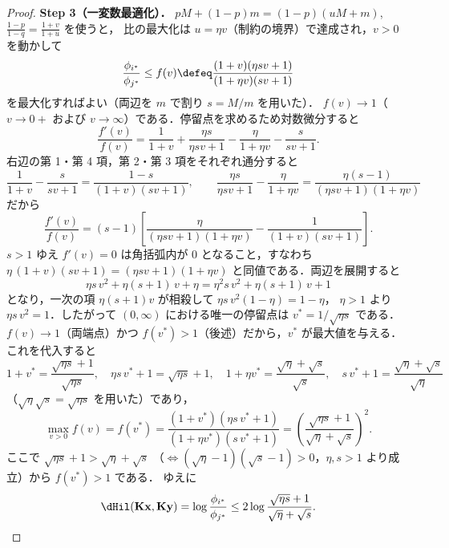 \begin{proof}
  \textbf{Step 3（一変数最適化）．}
  $p M + (1-p)m = (1-p)(uM + m)$, $\frac{1-p}{1-q} = \frac{1+v}{1+u}$ を使うと，
  比の最大化は $u = \eta v$（制約の境界）で達成され，$v > 0$ を動かして
  \[
    \frac{\phi_{i^*}}{\phi_{j^*}}
    \leq f(v) \defeq \frac{(1+v)(\eta s v + 1)}{(1+\eta v)(s v + 1)}
  \]
  を最大化すればよい（両辺を $m$ で割り $s = M/m$ を用いた）．
  $f(v) \to 1$（$v \to 0+$ および $v \to \infty$）である．停留点を求めるため対数微分すると
  \[
    \frac{f'(v)}{f(v)}
    = \frac{1}{1+v} + \frac{\eta s}{\eta s v + 1}
      - \frac{\eta}{1+\eta v} - \frac{s}{s v + 1}.
  \]
  右辺の第 1・第 4 項，第 2・第 3 項をそれぞれ通分すると
  \[
    \frac{1}{1+v} - \frac{s}{s v + 1}
    = \frac{1-s}{(1+v)(s v + 1)},
    \qquad
    \frac{\eta s}{\eta s v + 1} - \frac{\eta}{1+\eta v}
    = \frac{\eta(s-1)}{(\eta s v + 1)(1+\eta v)}
  \]
  だから
  \[
    \frac{f'(v)}{f(v)}
    = (s-1)\left[
        \frac{\eta}{(\eta s v + 1)(1+\eta v)}
        - \frac{1}{(1+v)(s v + 1)}
      \right].
  \]
  $s > 1$ ゆえ $f'(v) = 0$ は角括弧内が $0$ となること，すなわち
  $\eta\,(1+v)(s v + 1) = (\eta s v + 1)(1+\eta v)$ と同値である．両辺を展開すると
  \[
    \eta s\,v^2 + \eta(s+1)\,v + \eta
    = \eta^2 s\,v^2 + \eta(s+1)\,v + 1
  \]
  となり，一次の項 $\eta(s+1)v$ が相殺して $\eta s\,v^2 (1-\eta) = 1 - \eta$，
  $\eta > 1$ より $\eta s\,v^2 = 1$．したがって $(0,\infty)$ における唯一の停留点は
  $v^* = 1/\sqrt{\eta s}$ である．$f(v) \to 1$（両端点）かつ
  $f(v^*) > 1$（後述）だから，$v^*$ が最大値を与える．これを代入すると
  \[
    1 + v^* = \frac{\sqrt{\eta s}+1}{\sqrt{\eta s}},\quad
    \eta s\,v^* + 1 = \sqrt{\eta s}+1,\quad
    1 + \eta v^* = \frac{\sqrt{\eta}+\sqrt{s}}{\sqrt{s}},\quad
    s\,v^* + 1 = \frac{\sqrt{\eta}+\sqrt{s}}{\sqrt{\eta}}
  \]
  （$\sqrt{\eta}\sqrt{s} = \sqrt{\eta s}$ を用いた）であり，
  \[
    \max_{v>0} f(v) = f(v^*)
    = \frac{(1+v^*)(\eta s\,v^* + 1)}{(1+\eta v^*)(s\,v^* + 1)}
    = \left(\frac{\sqrt{\eta s} + 1}{\sqrt{\eta} + \sqrt{s}}\right)^{\!2}.
  \]
  ここで $\sqrt{\eta s} + 1 > \sqrt{\eta} + \sqrt{s}$
  （$\iff (\sqrt{\eta}-1)(\sqrt{s}-1) > 0$，$\eta, s > 1$ より成立）から
  $f(v^*) > 1$ である．
  ゆえに
  \[
    \dHil(\mathbf{K}\mathbf{x}, \mathbf{K}\mathbf{y})
    = \log\frac{\phi_{i^*}}{\phi_{j^*}}
    \leq 2\log\frac{\sqrt{\eta s} + 1}{\sqrt{\eta} + \sqrt{s}}.
  \]


\end{proof}
